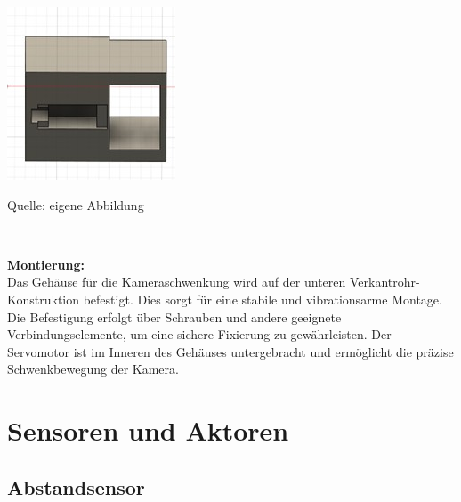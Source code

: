 \documentclass[ngerman,12pt,a4paper]{article}
\begin{document}
				\begin{center}
					\begin{minipage}[t]{0.2\textwidth}
						\includegraphics[scale=0.5]{Pictures/Aussparung_servo}
						\label{fig:camturn}
						\vspace{-10pt}
						\begin{center}
							\par\small Quelle: eigene Abbildung
						\end{center}
					\end{minipage} \\[0.70cm]
				\end{center}
				\textbf{Montierung:}\\[0.2cm]
				Das Gehäuse für die Kameraschwenkung wird auf der unteren Verkantrohr-Konstruktion befestigt. Dies sorgt für eine stabile und vibrationsarme Montage. Die Befestigung erfolgt über Schrauben und andere geeignete Verbindungselemente, um eine sichere Fixierung zu gewährleisten. Der Servomotor ist im Inneren des Gehäuses untergebracht und ermöglicht die präzise Schwenkbewegung der Kamera.
				
	\newpage
	\section{Sensoren und Aktoren}
		\subsection{Abstandsensor} %
\end{document}
